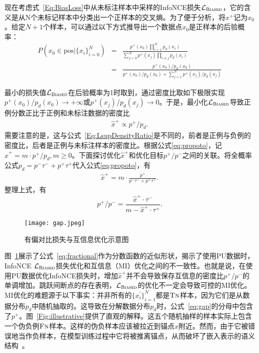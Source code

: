 现在考虑式~\eqref{Eq:BiasLoss}中从未标注样本中采样的InfoNCE损失$\mathcal{L}_\textsc{Biased}$，它的含义是从N个未标记样本中分类出一个正样本的交叉熵。为了便于分析，将$x^+$记为$x_0$。给定$N+1$个样本，可以通过以下方式推导出一个数据点$x_0$是正样本的后验概率：
\begin{eqnarray}
	P(x_0\in \textrm{pos}| \{x_i\}_{i=0} ^N) 
	&=& \frac{p^+(x_0) \prod_{i=1}^{N} p_d(x_i)}{\sum_{j=0}^{N} p^+(x_j) \prod_{i \neq j} p_d (x_i)} \nonumber \\
	&=& \frac{p^+(x_0)/p_d(x_0)}{p^+(x_0)/p_d(x_0) + \sum_{j=1}^{N} p^+(x_j)/p_d(x_j)}
\end{eqnarray}

最小的损失值$\mathcal{L}_\textsc{Biased}$在后验概率为1时取到，通过密度比取如下极限实现$p^+(x_0)/p_d(x_0) \rightarrow +\infty$或$p^+(x_j)/p_d(x_j)\rightarrow 0$。于是，最小化$\mathcal{L}_\textsc{Biased}$导致正例分数正比于正例和未标注数据的密度比
\begin{eqnarray}\label{eq:propoto}
	\hat{x}^+ \propto p^+/p_d.
\end{eqnarray}
需要注意的是，这与公式~\eqref{Eq:LsupDensityRatio}是不同的，前者是正例与负例的密度比，后者是正例与未标注样本的密度比。根据公式\eqref{eq:propoto}，记$\hat{x}^+ = m\cdot p^+/p_d, m \ge 0$。下面探讨优化$\hat{x}^+$和优化目标$p^+/p^-$之间的关联。将全概率公式$p_d = p^-\tau^-+ p^+\tau^+$代入公式\eqref{eq:propoto}，有
\begin{eqnarray} \label{eq:gap}
	\hat{x}^+ = m\cdot \frac{p^+}{p^-\tau^-+ p^+\tau^+}.
\end{eqnarray}
整理上式，有
\begin{equation}\label{eq:fractional}
	p^+/p^- = \frac{\hat{x}^+ \cdot \tau^-}{m-\hat{x}^+ \cdot \tau^+}.
\end{equation}
\par
\begin{figure}[!]
	\centering
	\texttt{[image: gap.jpeg]}
	\caption{有偏对比损失与互信息优化示意图}
	\label{Fig:gap}
\end{figure}
图~\ref{Fig:gap}展示了公式~\eqref{eq:fractional}作为分数函数的近似形状，揭示了使用PU数据时，InfoNCE $\mathcal{L}_\textsc{Biased}$损失优化和互信息（MI）优化之间的不一致性。也就是说，在使用PU数据优化InfoNCE损失时，增加$\hat{x}^+$并不会导致保存互信息的密度比$p^+/p^-$的单调增加。跳跃间断点的存在表明，$\mathcal{L}_\textsc{Biased}$的优化不一定会导致可控的MI优化。MI优化的难题源于以下事实：并非所有的$\{x_i^\prime\}_{i=1}^N$都是$\textsc{Tn}$样本，因为它们是从数据分布$ p_d $中随机抽取的。这导致在分解数据分布$ p_d $时，公式~\eqref{eq:gap}的分母中包含了$ p^+$。图~\ref{Fig:illustrative}提供了直观的解释。这五个随机抽样的样本实际上包含一个伪负例$\textsc{Fn}$样本。这样的伪负样本应该被拉近到锚点$x$附近。然而，由于它被错误地当作负样本，在模型训练过程中它将被推离锚点，从而破坏了嵌入表示的语义结构~\cite{Feng:2021:CVPR}。



